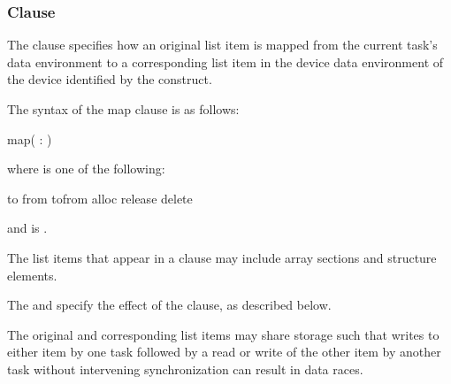 {{{{\subsubsection{ Clause}
\label{subsec:map Clause}
\summary
The  clause specifies how an original list item is mapped from the current task's data environment to a corresponding list item in the device data environment of the device identified by the construct.

\syntax
The syntax of the map clause is as follows:

\begin{boxedcode}
map(\plc{[ [map-type-modifier[,]] map-type} : \plc{] list})
\end{boxedcode}

where  is one of the following:

\begin{indentedcodelist}
to
from
tofrom
alloc
release
delete
\end{indentedcodelist}

and  is .

\descr
The list items that appear in a  clause may include array sections and structure elements.

The  and  specify the effect of the  clause, as described below.

The original and corresponding list items may share storage such that writes to either
item by one task followed by a read or write of the other item by another task without
intervening synchronization can result in data races.

}}}}
